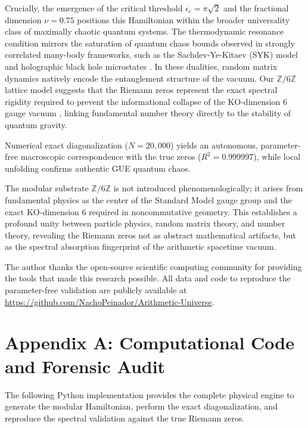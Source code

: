 \documentclass[prl,aps,floatfix,superscriptaddress,10pt]{revtex4-2}
\newcommand{\Zmod}{\mathbb{Z}/6\mathbb{Z}}
\begin{document}
Crucially, the emergence of the critical threshold $\epsilon_c = \pi\sqrt{2}$ and the fractional dimension $\nu = 0.75$ positions this Hamiltonian within the broader universality class of maximally chaotic quantum systems. The thermodynamic resonance condition mirrors the saturation of quantum chaos bounds observed in strongly correlated many-body frameworks, such as the Sachdev-Ye-Kitaev (SYK) model and holographic black hole microstates \cite{Saad2019}. In these dualities, random matrix dynamics natively encode the entanglement structure of the vacuum. Our $\Zmod$ lattice model suggests that the Riemann zeros represent the exact spectral rigidity required to prevent the informational collapse of the KO-dimension 6 gauge vacuum \cite{Connes2008}, linking fundamental number theory directly to the stability of quantum gravity.

Numerical exact diagonalization ($N=20,000$) yields an autonomous, parameter-free macroscopic correspondence with the true zeros ($R^2 = 0.999997$), while local unfolding confirms authentic GUE quantum chaos.

The modular substrate $\Zmod$ is not introduced phenomenologically; it arises from fundamental physics as the center of the Standard Model gauge group and the exact KO-dimension 6 required in noncommutative geometry. This establishes a profound unity between particle physics, random matrix theory, and number theory, revealing the Riemann zeros not as abstract mathematical artifacts, but as the spectral absorption fingerprint of the arithmetic spacetime vacuum.

\begin{acknowledgments}
The author thanks the open-source scientific computing community for providing the tools that made this research possible.
All data and code to reproduce the parameter-free validation are publicly available at \url{https://github.com/NachoPeinador/Arithmetic-Universe}.
\end{acknowledgments}

\appendix

\section{Appendix A: Computational Code and Forensic Audit}

The following Python implementation provides the complete physical engine to generate the modular Hamiltonian, perform the exact diagonalization, and reproduce the spectral validation against the true Riemann zeros.
\end{document}
